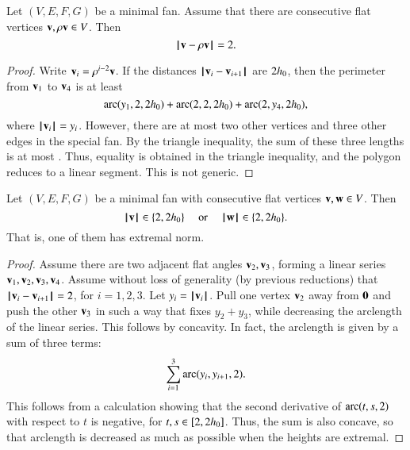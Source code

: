 \begin{lemma}  Let $(V,E,F,G)$ be a minimal fan. Assume that there are consecutive flat vertices ${\mathbf v},\rho {\mathbf v}\in V$. 
Then 
$$
{\hskip0.1em|\hskip-0.15em|\hskip0.1em}{\mathbf v} - \rho {\mathbf v}{\hskip0.1em|\hskip-0.15em|\hskip0.1em} = 2.
$$
\end{lemma}

\begin{proof} Write ${\mathbf v}_i = \rho^{i-2} {\mathbf v}$.  If the distances ${\hskip0.1em|\hskip-0.15em|\hskip0.1em}{\mathbf v}_i - {\mathbf v}_{i+1}{\hskip0.1em|\hskip-0.15em|\hskip0.1em}$ are $2{h_0}$, then the perimeter from ${\mathbf v}_1$ to ${\mathbf v}_4$ is at least
\begin{equation}\label{eqn:3side}
\operatorname{arc}(y_1,2,2{h_0})+\operatorname{arc}(2,2,2{h_0})+\operatorname{arc}(2,y_4,2{h_0}),
\end{equation}
where ${{\hskip0.1em|\hskip-0.15em|\hskip0.1em}{\mathbf v}_i{\hskip0.1em|\hskip-0.15em|\hskip0.1em}}=y_i$.
However, there are at most two other vertices and three other edges in the special fan.  By the triangle inequality, the sum of these three lengths is at most .
Thus, equality is obtained in the triangle inequality, and the polygon reduces to a linear segment.  This is not generic.
\end{proof}

\begin{lemma} Let $(V,E,F,G)$ be a minimal fan with consecutive flat vertices ${\mathbf v},{\mathbf w}\in V$.  Then 
$${{\hskip0.1em|\hskip-0.15em|\hskip0.1em}{\mathbf v}{\hskip0.1em|\hskip-0.15em|\hskip0.1em}}\in \{2,2{h_0}\}\quad\text{ or }\quad {{\hskip0.1em|\hskip-0.15em|\hskip0.1em}{\mathbf w}{\hskip0.1em|\hskip-0.15em|\hskip0.1em}}\in \{2,2{h_0}\}.$$
That is, one of them has extremal norm.
%
%
\end{lemma}

\begin{proof}
Assume there are two adjacent flat angles ${\mathbf v}_2,{\mathbf v}_3$, forming a linear series ${\mathbf v}_1,{\mathbf v}_2,{\mathbf v}_3,{\mathbf v}_4$.
Assume without loss of generality (by previous reductions) that
%
${\hskip0.1em|\hskip-0.15em|\hskip0.1em}{\mathbf v}_i - {\mathbf v}_{i+1}{\hskip0.1em|\hskip-0.15em|\hskip0.1em}=2$, for $i=1,2,3$.
Let $y_i = {{\hskip0.1em|\hskip-0.15em|\hskip0.1em}{\mathbf v}_i{\hskip0.1em|\hskip-0.15em|\hskip0.1em}}$.
Pull one vertex ${\mathbf v}_2$ away from ${\mathbf 0}$ and push the other ${\mathbf v}_3$ in such a way that fixes $y_2+y_3$, while decreasing the arclength of the linear series.  This follows by concavity.
In fact, the arclength is given by a sum of three terms:
  $$
  \sum_{i=1}^3\operatorname{arc}(y_i,y_{i+1},2).
  $$
This follows from a calculation showing that the second derivative of $\operatorname{arc}(t,s,2)$ with respect to $t$ is negative, for $t,s\in[2,2{h_0}]$.  Thus, the
sum is also concave, so that arclength is decreased as much as possible when the heights are extremal.
\end{proof}

